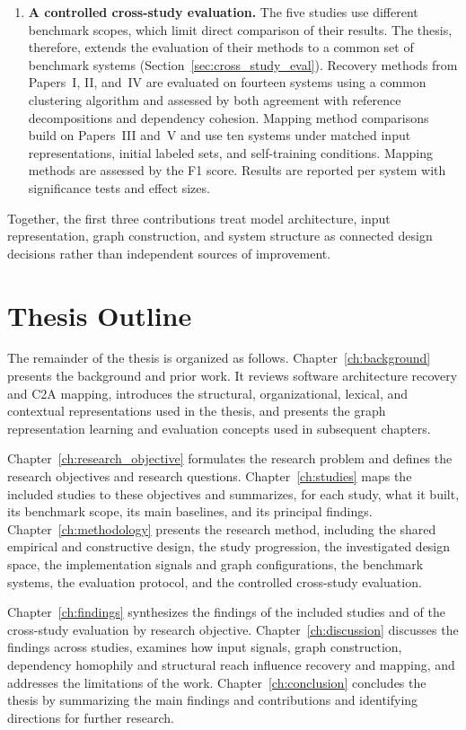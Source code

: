 \begin{enumerate}[leftmargin=1em]
    \item \textbf{A controlled cross-study evaluation.} The five studies use different benchmark scopes, which limit direct comparison of their results. The thesis, therefore, extends the evaluation of their methods to a common set of benchmark systems (Section~\ref{sec:cross_study_eval}). Recovery methods from Papers~I, II, and~IV are evaluated on fourteen systems using a common clustering algorithm and assessed by both agreement with reference decompositions and dependency cohesion. Mapping method comparisons build on Papers~III and~V and use ten systems under matched input representations, initial labeled sets, and self-training conditions. Mapping methods are assessed by the F1 score. Results are reported per system with significance tests and effect sizes.
\end{enumerate}

Together, the first three contributions treat model architecture, input representation, graph construction, and system structure as connected design decisions rather than independent sources of improvement.

\section{Thesis Outline \label{sec:thesis-outline}}

The remainder of the thesis is organized as follows. Chapter~\ref{ch:background} presents the background and prior work. It reviews software architecture recovery and C2A mapping, introduces the structural, organizational, lexical, and contextual representations used in the thesis, and presents the graph representation learning and evaluation concepts used in subsequent chapters.

Chapter~\ref{ch:research_objective} formulates the research problem and defines the research objectives and research questions. Chapter~\ref{ch:studies} maps the included studies to these objectives and summarizes, for each study, what it built, its benchmark scope, its main baselines, and its principal findings. Chapter~\ref{ch:methodology} presents the research method, including the shared empirical and constructive design, the study progression, the investigated design space, the implementation signals and graph configurations, the benchmark systems, the evaluation protocol, and the controlled cross-study evaluation.

Chapter~\ref{ch:findings} synthesizes the findings of the included studies and of the cross-study evaluation by research objective. Chapter~\ref{ch:discussion} discusses the findings across studies, examines how input signals, graph construction, dependency homophily and structural reach influence recovery and mapping, and addresses the limitations of the work. Chapter~\ref{ch:conclusion} concludes the thesis by summarizing the main findings and contributions and identifying directions for further research.

